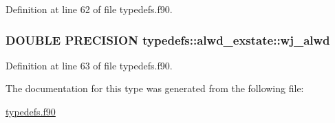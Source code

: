 Definition at line 62 of file typedefs.f90.\hypertarget{typetypedefs_1_1alwd__exstate_a9af30d9eafe61b2467f45a93bd9784d4}{
\subsubsection[{wj\_\-alwd}]{\setlength{\rightskip}{0pt plus 5cm}DOUBLE PRECISION {\bf typedefs::alwd\_\-exstate::wj\_\-alwd}}}
\label{typetypedefs_1_1alwd__exstate_a9af30d9eafe61b2467f45a93bd9784d4}


Definition at line 63 of file typedefs.f90.

The documentation for this type was generated from the following file:\begin{DoxyCompactItemize}
\item 
\hyperlink{typedefs_8f90}{typedefs.f90}\end{DoxyCompactItemize}
